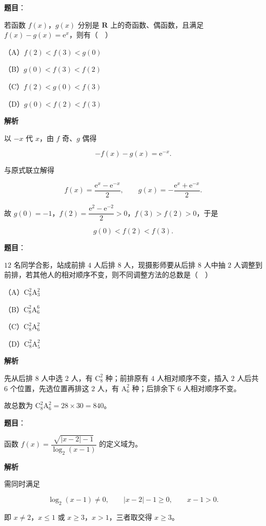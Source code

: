 \begin{answer}

\textbf{题目}：

若函数 $f(x)$，$g(x)$ 分别是 $\mathbf R$ 上的奇函数、偶函数，且满足 $f(x)-g(x)=\mathrm e^x$，则有（　）

（A）$f(2)<f(3)<g(0)$

（B）$g(0)<f(3)<f(2)$

（C）$f(2)<g(0)<f(3)$

（D）$g(0)<f(2)<f(3)$

\textbf{解析}

以 $-x$ 代 $x$，由 $f$ 奇、$g$ 偶得

\nopagebreak[4]
\[-f(x)-g(x)=\mathrm e^{-x}.\]

与原式联立解得

\nopagebreak[4]
\[f(x)=\frac{\mathrm e^x-\mathrm e^{-x}}2,\qquad g(x)=-\frac{\mathrm e^x+\mathrm e^{-x}}2.\]

故 $g(0)=-1$，$f(2)=\dfrac{\mathrm e^2-\mathrm e^{-2}}2>0$，$f(3)>f(2)>0$，于是

\nopagebreak[4]
\[g(0)<f(2)<f(3).\]


\end{answer}
\begin{answer}

\textbf{题目}：

$12$ 名同学合影，站成前排 $4$ 人后排 $8$ 人，现摄影师要从后排 $8$ 人中抽 $2$ 人调整到前排，若其他人的相对顺序不变，则不同调整方法的总数是（　）

（A）$\mathrm C_8^2\mathrm A_3^2$

（B）$\mathrm C_8^2\mathrm A_6^6$

（C）$\mathrm C_8^2\mathrm A_6^2$

（D）$\mathrm C_8^2\mathrm A_5^2$

\textbf{解析}

先从后排 $8$ 人中选 $2$ 人，有 $\mathrm C_8^2$ 种；前排原有 $4$ 人相对顺序不变，插入 $2$ 人后共 $6$ 个位置，先选位置再排这 $2$ 人，有 $\mathrm A_6^2$ 种；后排余下 $6$ 人相对顺序不变。

故总数为 $\mathrm C_8^2\mathrm A_6^2=28\times30=840$。


\end{answer}
\begin{answer}

\textbf{题目}：

函数 $f(x)=\dfrac{\sqrt{|x-2|-1}}{\log_2(x-1)}$ 的定义域为\gkblank{}。

\textbf{解析}

需同时满足

\nopagebreak[4]
\[\log_2(x-1)\neq0,\qquad |x-2|-1\geqslant0,\qquad x-1>0.\]

即 $x\neq2$，$x\leqslant1$ 或 $x\geqslant3$，$x>1$，三者取交得 $x\geqslant3$。

\gkanswer{答案：$[3,+\infty)$。}

\end{answer}
